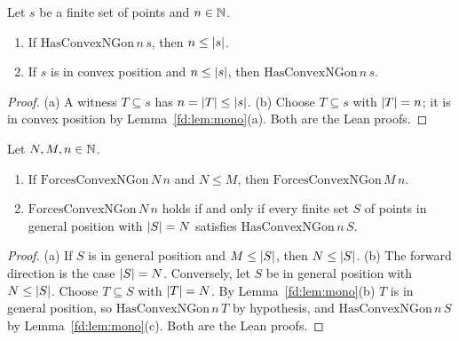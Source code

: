 \begin{lemma}\label{fd:lem:ngon-basic}\sloppy
Let $s$ be a finite set of points and $n\in\mathbb N$.
\begin{enumerate}[label=(\alph*)]
\item If $\mathrm{HasConvexNGon}\,n\,s$, then $n\le\lvert s\rvert$.
\item If $s$ is in convex position and $n\le\lvert s\rvert$, then $\mathrm{HasConvexNGon}\,n\,s$.
\end{enumerate}
\end{lemma}

\begin{proof}
(a) A witness $T\subseteq s$ has $n=\lvert T\rvert\le\lvert s\rvert$. (b) Choose $T\subseteq s$ with $\lvert T\rvert=n$; it is
in convex position by Lemma~\ref{fd:lem:mono}(a). Both are the Lean proofs.
\end{proof}

\begin{lemma}\label{fd:lem:forces-basic}\sloppy
Let $N,M,n\in\mathbb N$.
\begin{enumerate}[label=(\alph*)]
\item If $\mathrm{ForcesConvexNGon}\,N\,n$ and $N\le M$, then $\mathrm{ForcesConvexNGon}\,M\,n$.
\item $\mathrm{ForcesConvexNGon}\,N\,n$ holds if and only if every finite set $S$ of points in general
  position with $\lvert S\rvert=N$ satisfies $\mathrm{HasConvexNGon}\,n\,S$.
\end{enumerate}
\end{lemma}

\begin{proof}
(a) If $S$ is in general position and $M\le\lvert S\rvert$, then $N\le\lvert S\rvert$. (b) The forward direction is the
case $\lvert S\rvert=N$. Conversely, let $S$ be in general position with $N\le\lvert S\rvert$. Choose $T\subseteq S$ with
$\lvert T\rvert=N$. By Lemma~\ref{fd:lem:mono}(b) $T$ is in general position, so $\mathrm{HasConvexNGon}\,n\,T$
by hypothesis, and $\mathrm{HasConvexNGon}\,n\,S$ by Lemma~\ref{fd:lem:mono}(c). Both are the Lean
proofs.
\end{proof}

